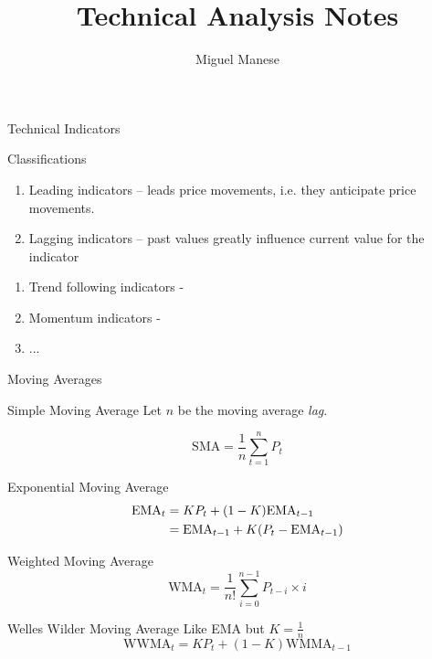 \documentclass{article}
\title{Technical Analysis Notes}
\author{Miguel Manese}
\date{}
\begin{document}
\maketitle

\begin{section}{Technical Indicators}
\begin{subsection}{Classifications}

\begin{enumerate}
  \item Leading indicators -- leads price movements, i.e. they anticipate price movements.
  \item Lagging indicators -- past values greatly influence current value for the indicator
\end{enumerate}

\begin{enumerate}
\item Trend following indicators - 
\item Momentum indicators - 
\item ...
\end{enumerate}

\end{subsection}

\begin{subsection}{Moving Averages}

  \begin{subsubsection}{Simple Moving Average}
    Let $n$ be the moving average \emph{lag}.

    \[ \text{SMA} = \frac{1}{n} \sum_{t=1}^n P_t \]
  \end{subsubsection}

  \begin{subsubsection}{Exponential Moving Average}
    \begin{align}
      \text{EMA}_t &= K P_t + (1 - K) \text{EMA}_{t-1} \notag\\
                   &= \text{EMA}_{t-1} + K (P_t - \text{EMA}_{t-1}) \notag
    \end{align}
  \end{subsubsection}


  \begin{subsubsection}{Weighted Moving Average}
    \[ \text{WMA}_t = \frac{1}{n!} \sum_{i=0}^{n-1} P_{t-i} \times i \]
  \end{subsubsection}

  \begin{subsubsection}{Welles Wilder Moving Average}
    Like EMA but $K = \frac{1}{n}$
    \[ \text{WWMA}_t = K P_t + (1 - K) \text{WMMA}_{t-1} \]


\end{subsubsection}
\end{subsection}
\end{section}
\end{document}
